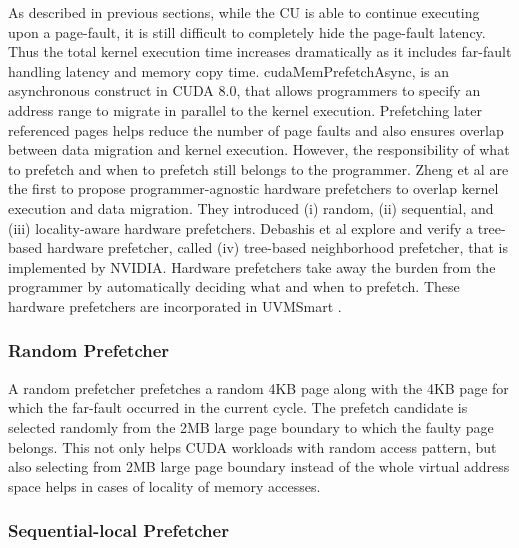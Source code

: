 As described in previous sections, while the CU is able to continue executing upon a page-fault, it is still difficult to completely hide the page-fault latency. Thus the total kernel execution time increases dramatically as it includes far-fault handling latency and memory copy time. cudaMemPrefetchAsync, is an asynchronous construct in CUDA 8.0, that allows programmers to specify an address range to migrate in parallel to the kernel execution. Prefetching later referenced pages helps reduce the number of page faults and also ensures overlap between data migration and kernel execution. However, the responsibility of what to prefetch and when to prefetch still belongs to the programmer. Zheng et al \cite{7446077} are the first to propose programmer-agnostic hardware prefetchers to overlap kernel execution and data migration. They introduced (i) random, (ii) sequential, and (iii) locality-aware hardware prefetchers. Debashis et al explore and verify a tree-based hardware prefetcher, called (iv) tree-based neighborhood prefetcher, that is implemented by NVIDIA. Hardware prefetchers take away the burden from the programmer by automatically deciding what and when to prefetch. These hardware prefetchers are incorporated in UVMSmart \cite{9139797}.


\subsubsection{Random Prefetcher}

A random prefetcher prefetches a random 4KB page along with the 4KB page for which the far-fault occurred in the current cycle. The prefetch candidate is selected randomly from the 2MB large page boundary to which the faulty page belongs. This not only helps CUDA workloads with random access pattern, but also selecting from 2MB large page boundary instead of the whole virtual address space helps in cases of locality of memory accesses.

\subsubsection{Sequential-local Prefetcher}

